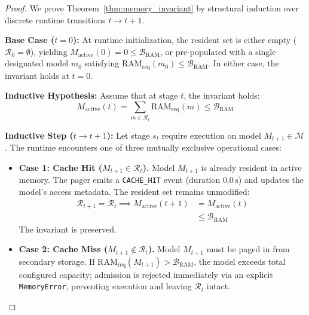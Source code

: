 \begin{proof}
We prove Theorem~\ref{thm:memory_invariant} by structural induction over discrete runtime transitions $t \to t+1$.

\noindent\textbf{Base Case ($t=0$):} At runtime initialization, the resident set is either empty ($\mathcal{R}_0 = \emptyset$), yielding $M_{\text{active}}(0) = 0 \le \mathcal{B}_{\text{RAM}}$, or pre-populated with a single designated model $m_0$ satisfying $\text{RAM}_{\text{req}}(m_0) \le \mathcal{B}_{\text{RAM}}$. In either case, the invariant holds at $t=0$.

\noindent\textbf{Inductive Hypothesis:} Assume that at stage $t$, the invariant holds:
\begin{equation}
M_{\text{active}}(t) = \sum_{m \in \mathcal{R}_t} \text{RAM}_{\text{req}}(m) \le \mathcal{B}_{\text{RAM}}
\end{equation}

\noindent\textbf{Inductive Step ($t \to t+1$):} Let stage $s_t$ require execution on model $M_{t+1} \in \mathcal{M}$. The runtime encounters one of three mutually exclusive operational cases:

\begin{itemize}
    \item \textbf{Case 1: Cache Hit ($M_{t+1} \in \mathcal{R}_t$).} Model $M_{t+1}$ is already resident in active memory. The pager emits a \texttt{CACHE\_HIT} event (duration $0.0\,\text{s}$) and updates the model's access metadata. The resident set remains unmodified:
    \begin{equation}
    \begin{aligned}
    \mathcal{R}_{t+1} = \mathcal{R}_t \implies M_{\text{active}}(t+1) &= M_{\text{active}}(t) \\
    &\le \mathcal{B}_{\text{RAM}}
    \end{aligned}
    \end{equation}
    The invariant is preserved.

    \item \textbf{Case 2: Cache Miss ($M_{t+1} \notin \mathcal{R}_t$).} Model $M_{t+1}$ must be paged in from secondary storage. If $\text{RAM}_{\text{req}}(M_{t+1}) > \mathcal{B}_{\text{RAM}}$, the model exceeds total configured capacity; admission is rejected immediately via an explicit \texttt{MemoryError}, preventing execution and leaving $\mathcal{R}_t$ intact. 
    

\end{itemize}
\end{proof}
